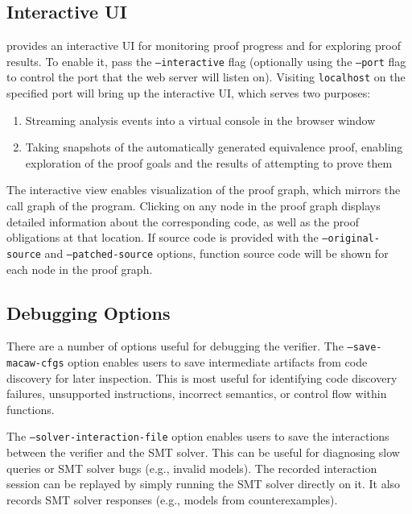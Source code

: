 
\subsection{Interactive UI}\label{sec:options:interaction}

\TOOL{} provides an interactive UI for monitoring proof progress and for exploring proof results.  To enable it, pass the \texttt{--interactive} flag (optionally using the \texttt{--port} flag to control the port that the web server will listen on).  Visiting \texttt{localhost} on the specified port will bring up the interactive UI, which serves two purposes:

\begin{enumerate}
\item Streaming analysis events into a virtual console in the browser window
\item Taking snapshots of the automatically generated equivalence proof, enabling exploration of the proof goals and the results of attempting to prove them
\end{enumerate}

The interactive view enables visualization of the proof graph, which mirrors the call graph of the program. Clicking on any node in the proof graph displays detailed information about the corresponding code, as well as the proof obligations at that location. If source code is provided with the \texttt{--original-source} and \texttt{--patched-source} options, function source code will be shown for each node in the proof graph.

\subsection{Debugging Options}

There are a number of options useful for debugging the \TOOL{} verifier. The \texttt{--save-macaw-cfgs} option enables users to save intermediate artifacts from code discovery for later inspection. This is most useful for identifying code discovery failures, unsupported instructions, incorrect semantics, or control flow within functions.

The \texttt{--solver-interaction-file} option enables users to save the interactions between the \TOOL{} verifier and the SMT solver. This can be useful for diagnosing slow queries or SMT solver bugs (e.g., invalid models). The recorded interaction session can be replayed by simply running the SMT solver directly on it. It also records SMT solver responses (e.g., models from counterexamples).
